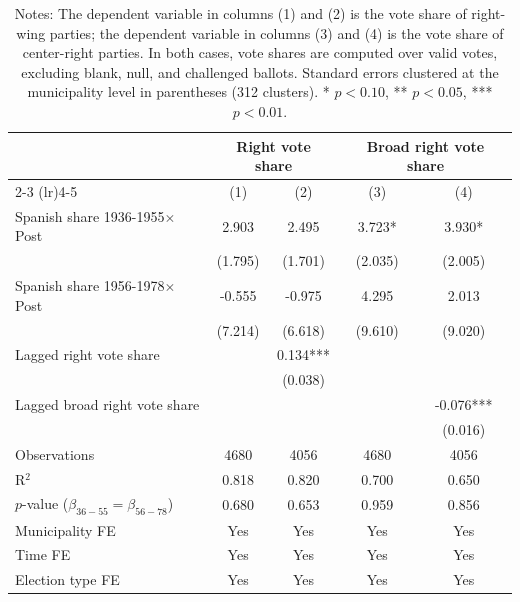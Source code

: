\begin{table}[!h]
\caption{Effects on Right-Wing Vote Shares}
\renewcommand{\arraystretch}{1.25}
\setlength{\tabcolsep}{8pt}
\centering
\begin{tabular}[t]{lcccc}
\hline
 & \multicolumn{2}{c}{Right vote share} & \multicolumn{2}{c}{Broad right vote share} \\
\cmidrule(lr){2-3} \cmidrule(lr){4-5}
  & (1) & (2) & (3) & (4)\\
\hline
Spanish share 1936-1955$\times$Post & 2.903 & 2.495 & 3.723* & 3.930*\\
 & (1.795) & (1.701) & (2.035) & (2.005)\\
Spanish share 1956-1978$\times$Post & -0.555 & -0.975 & 4.295 & 2.013\\
 & (7.214) & (6.618) & (9.610) & (9.020)\\
Lagged right vote share &  & 0.134*** &  & \\
 &  & (0.038) &  & \\
Lagged broad right vote share &  &  &  & -0.076***\\
 &  &  &  & (0.016)\\

\addlinespace
Observations & 4680 & 4056 & 4680 & 4056\\
R$^2$ & 0.818 & 0.820 & 0.700 & 0.650\\
$p$-value ($\beta_{36{-}55} = \beta_{56{-}78}$) & 0.680 & 0.653 & 0.959 & 0.856\\
Municipality FE & Yes & Yes & Yes & Yes\\
Time FE & Yes & Yes & Yes & Yes\\
Election type FE & Yes & Yes & Yes & Yes\\
\hline
\end{tabular}
\vspace{0.3em}
\captionsetup{justification=justified}
\caption*{\footnotesize Notes: The dependent variable in columns (1) and (2) is the vote share of right-wing parties; the dependent variable in columns (3) and (4) is the vote share of center-right parties. In both cases, vote shares are computed over valid votes, excluding blank, null, and challenged ballots. Standard errors clustered at the municipality level in parentheses (312 clusters). * $p<0.10$, ** $p<0.05$, *** $p<0.01$.}
\end{table}
